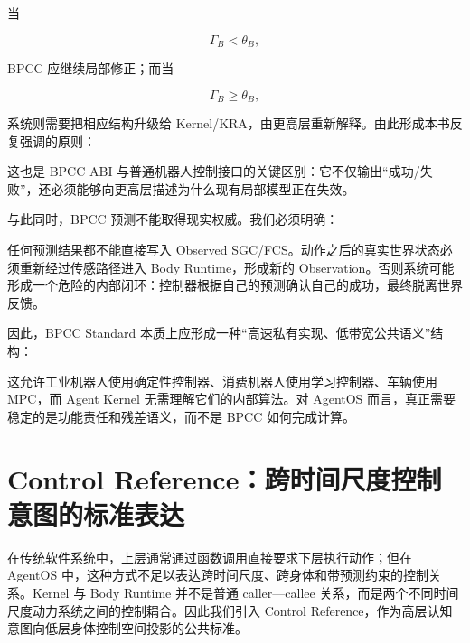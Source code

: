 当

\[
\Gamma_B<\theta_B,
\]

BPCC 应继续局部修正；而当

\[
\Gamma_B\geq\theta_B,
\]

系统则需要把相应结构升级给 Kernel/KRA，由更高层重新解释。由此形成本书反复强调的原则：

\begin{statementbox}
\centering
{}
\end{statementbox}

这也是 BPCC ABI 与普通机器人控制接口的关键区别：它不仅输出``成功/失败''，还必须能够向更高层描述为什么现有局部模型正在失效。

与此同时，BPCC 预测不能取得现实权威。我们必须明确：

\begin{statementbox}
\centering
{}
\end{statementbox}

任何预测结果都不能直接写入 Observed SGC/FCS。动作之后的真实世界状态必须重新经过传感路径进入 Body Runtime，形成新的 Observation。否则系统可能形成一个危险的内部闭环：控制器根据自己的预测确认自己的成功，最终脱离世界反馈。

因此，BPCC Standard 本质上应形成一种``高速私有实现、低带宽公共语义''结构：

\begin{statementbox}
\centering
{}
\end{statementbox}

这允许工业机器人使用确定性控制器、消费机器人使用学习控制器、车辆使用 MPC，而 Agent Kernel 无需理解它们的内部算法。对 AgentOS 而言，真正需要稳定的是功能责任和残差语义，而不是 BPCC 如何完成计算。

\section{Control Reference：跨时间尺度控制意图的标准表达}

在传统软件系统中，上层通常通过函数调用直接要求下层执行动作；但在 AgentOS 中，这种方式不足以表达跨时间尺度、跨身体和带预测约束的控制关系。Kernel 与 Body Runtime 并不是普通 caller---callee 关系，而是两个不同时间尺度动力系统之间的控制耦合。因此我们引入 Control Reference，作为高层认知意图向低层身体控制空间投影的公共标准。

